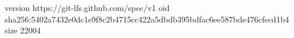 version https://git-lfs.github.com/spec/v1
oid sha256:5402a7432e0dc1e9f8c2b4715cc422a5dbdb395bdfac6ee587bde476cfecd1b4
size 22004
